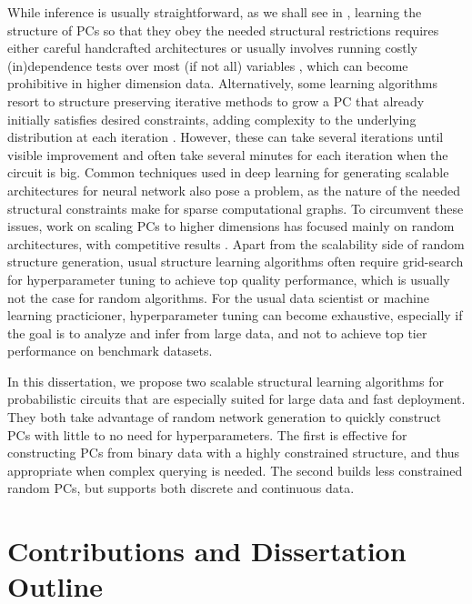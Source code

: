 While inference is usually straightforward, as we shall see in , learning the
structure of PCs so that they obey the needed structural restrictions requires either careful
handcrafted architectures \citep{poon11,cheng14,nath16} or usually involves running costly
(in)dependence tests over most (if not all) variables \citep{gens13,jaini18a,vergari15,dimauro17a},
which can become prohibitive in higher dimension data. Alternatively, some learning algorithms
resort to structure preserving iterative methods to grow a PC that already initially satisfies
desired constraints, adding complexity to the underlying distribution at each iteration
\citep{liang17,dang20}. However, these can take several iterations until visible improvement and
often take several minutes for each iteration when the circuit is big. Common techniques used in
deep learning for generating scalable architectures for neural network also pose a problem, as the
nature of the needed structural constraints make for sparse computational graphs. To circumvent
these issues, work on scaling PCs to higher dimensions has focused mainly on random architectures,
with competitive results \citep{peharz20a,dimauro21,geh21a,peharz20b}. Apart from the scalability
side of random structure generation, usual structure learning algorithms often require grid-search
for hyperparameter tuning to achieve top quality performance, which is usually not the case for
random algorithms. For the usual data scientist or machine learning practicioner, hyperparameter
tuning can become exhaustive, especially if the goal is to analyze and infer from large data, and
not to achieve top tier performance on benchmark datasets.

In this dissertation, we propose two scalable structural learning algorithms for probabilistic
circuits that are especially suited for large data and fast deployment. They both take advantage of
random network generation to quickly construct PCs with little to no need for hyperparameters. The
first is effective for constructing PCs from binary data with a highly constrained structure, and
thus appropriate when complex querying is needed. The second builds less constrained random PCs,
but supports both discrete and continuous data.

\section{Contributions and Dissertation Outline}

